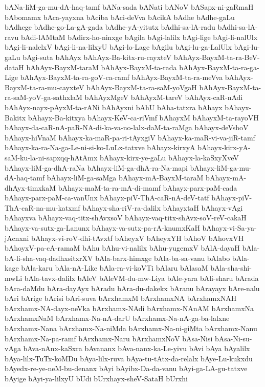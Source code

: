 {bANa-liM-ga-mu-dA-haq-tamf
bANa-sada
bANati
bANoV
bASapx-ni-gaRmaH
bAbomamx
bAca-yayxna
bAciba
bAci-deVva
bAcikA
bAdhe
bAdhe-gaLu
bAdhege
bAdhe-go-La-gA-gada
bAdhe-yA-yitutx
bAdhi-sa-lA-radu
bAdhi-sa-lA-ravu
bAdi-lAMtaM
bAdirx-ho-ninxge
bAgila
bAgi-lalilx
bAgi-lige
bAgi-li-nalUlx
bAgi-li-nalelxV
bAgi-li-na-lilxyU
bAgi-lo-Lage
bAgilu
bAgi-lu-ga-LalUlx
bAgi-lu-gaLu
bAgi-suta
bAhAyx
bAhAyx-Ba-kitx-ru-cayxteV
bAhAyx-BayxM-ta-ra-BeV-dataH
bAhAyx-BayxM-taraM
bAhAyx-BayxM-ta-rada
bAhAyx-BayxM-ta-ra-ga-Lige
bAhAyx-BayxM-ta-ra-goV-ca-ramf
bAhAyx-BayxM-ta-ra-meVva
bAhAyx-BayxM-ta-ra-mu-cayxteV
bAhAyx-BayxM-ta-ra-saM-yoVgaH
bAhAyx-BayxM-ta-ra-saM-yoV-ga-sathxlaM
bAhAyxMgeV
bAhAyxM-tareV
bAhAyx-caR-nAdi
bAhAyx-nayx-pAyxM-ta-rANi
bAhAyxni
bAhU
bAha-tatxra
bAhayx
bAhayx-Bakitx
bAhayx-Ba-kitxya
bAhayx-KeV-ca-riVmf
bAhayxM
bAhayxM-ta-rayoVH
bAhayx-da-caR-nA-paR-NA-di-ka-va-no-lalx-daM-ta-raMga
bAhayx-deVshoV
bAhayx-hiVnaM
bAhayx-ka-maR-pa-ri-tAyxgiV
bAhayx-ka-maR-vi-va-jiR-tamf
bAhayx-ka-ra-Na-ga-Le-ni-si-ko-LuLx-tatxve
bAhayx-kirxyA
bAhayx-kirx-yA-saM-ku-la-ni-sapxqq-hAtAmx
bAhayx-kirx-ye-gaLu
bAhayx-la-kaSxyXveV
bAhayx-liM-ga-dhA-raNa
bAhayx-liM-ga-dhA-ra-Na-mapi
bAhayx-liM-ga-mu-dA-haq-tamf
bAhayx-liM-ga-saMga
bAhayx-mA-BayxM-taraM
bAhayx-mA-dhAyx-timxkaM
bAhayx-maM-ta-ra-mA-di-mamf
bAhayx-parx-paM-cada
bAhayx-parx-paM-ca-vanUnx
bAhayx-piV-ThA-caR-nA-deV-tatf
bAhayx-piV-ThA-caR-na-mu-katxmf
bAhayx-sha-riV-ra-dalilx
bAhayxtaH
bAhayx-vAgi
bAhayxva
bAhayx-vaq-titx-shAvxsoV
bAhayx-vaq-titx-shAvx-soV-reV-cakaH
bAhayx-va-sutx-ga-Lanunx
bAhayx-va-sutx-pa-rA-knumxKaH
bAhayx-vi-Sa-ya-jAcnxni
bAhayx-vi-roV-dhi-tAvxtf
bAheyxV
bAheyxYH
bAhoV
bAhovxVH
bAhoyxV-pa-cA-ramaM
bAhu
bAhu-vi-nalilx
bAhu-yugemxV
bAlA-dayaH
bAla-bA-li-sha-vaq-dadhxsitxrXV
bAla-barx-himxge
bAla-ba-sa-vanu
bAlabo
bAla-kage
bAla-karu
bAla-nA-Like
bAla-ra-vi-koVTi
bAlaru
bAlasaM
bAla-sha-shi-mwLi
bAla-tavx-dalilx
bAleV
bAleVM-du-mw-Liya
bAle-yara
bAli-sharu
bArada
bAra-daMdu
bAra-dayAyx
bAradu
bAra-du-dakekx
bAranu
bArayayx
bAre-nalu
bAri
bArige
bArisi
bAri-suva
bArxhamxM
bArxhamxNA
bArxhamxNAH
bArxhamx-NA-dayx-neVka
bArxhamx-NAdi
bArxhamx-NAnAM
bArxhamxNa
bArxhamxNaM
bArxhamx-Na-nA-darU
bArxhamx-Na-nA-ga-ba-lalxne
bArxhamx-Nana
bArxhamx-Na-niMda
bArxhamx-Na-ni-giMta
bArxhamx-Nanu
bArxhamx-Na-pa-ramf
bArxhamx-Naru
bArxhamxNoV
bAsa-Nisi
bAsa-Ni-su-vAga
bAva-nAnx-kaSxra
bAvananx
bAva-nanx-ka-Le-yivu
bAvi
bAya
bAyalilx
bAya-lilx-TuTx-koMDu
bAya-lilx-ruva
bAya-tu-tAtx-da-relalx
bAye-Lu-kukxdu
bAyedx-re-ye-neM-bu-denanx
bAyi
bAyibx-Da-da-vanu
bAyi-ga-LA-gu-tatxve
bAyige
bAyi-ya-lilxyU
bUdi
bUrxhayx-sheV-SataH
bUrxhi
}
